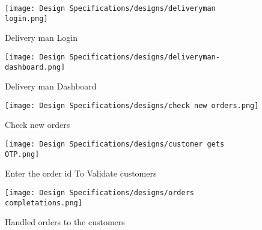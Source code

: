 \begin{figure}[ht]
    \centering  
    \texttt{[image: Design Specifications/designs/deliveryman login.png]}    
    \caption{Delivery man Login}
    \label{fig:fig 5.24}
\end{figure}
\begin{figure}[ht]
    \centering  
    \texttt{[image: Design Specifications/designs/deliveryman-dashboard.png]}    
    \caption{Delivery man Dashboard}
    \label{fig:fig 5.25}
\end{figure}
\begin{figure}[ht]
    \centering  
    \texttt{[image: Design Specifications/designs/check new orders.png]}    
    \caption{Check new orders}
    \label{fig:fig 5.26}
\end{figure}
\begin{figure}[ht]
    \centering  
    \texttt{[image: Design Specifications/designs/customer gets OTP.png]}    
    \caption{Enter the order id To Validate customers}
    \label{fig:fig 5.27}
\end{figure}
\begin{figure}[ht]
    \centering  
    \texttt{[image: Design Specifications/designs/orders completations.png]}    
    \caption{Handled orders to the customers}
    \label{fig:fig 5.28}
\end{figure}